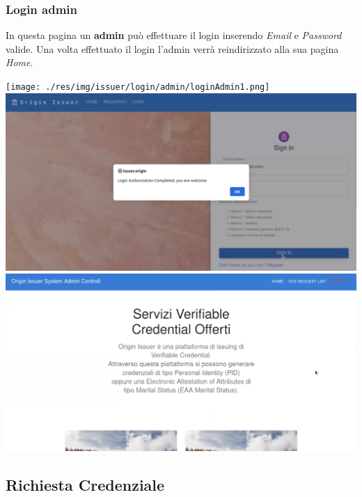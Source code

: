 \subsubsection{Login admin}
In questa pagina un \textbf{admin} può effettuare il login inserendo \textit{Email} e \textit{Password} valide. Una volta effettuato il login l'admin verrà reindirizzato alla sua pagina \textit{Home}.
\begin{center}
\texttt{[image: ./res/img/issuer/login/admin/loginAdmin1.png]}
\includegraphics[scale = 0.2]{./res/img/issuer/login/admin/loginAdmin2.png}
\includegraphics[scale = 0.2]{./res/img/issuer/login/admin/loginAdmin3.png}
\end{center}

\subsection{Richiesta Credenziale}
